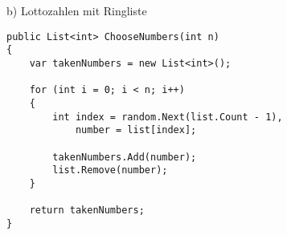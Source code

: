 b) Lottozahlen mit Ringliste
\begin{verbatim}
public List<int> ChooseNumbers(int n)
{
    var takenNumbers = new List<int>();

    for (int i = 0; i < n; i++)
    {
        int index = random.Next(list.Count - 1),
            number = list[index];

        takenNumbers.Add(number);
        list.Remove(number);
    }

    return takenNumbers;
}
\end{verbatim}